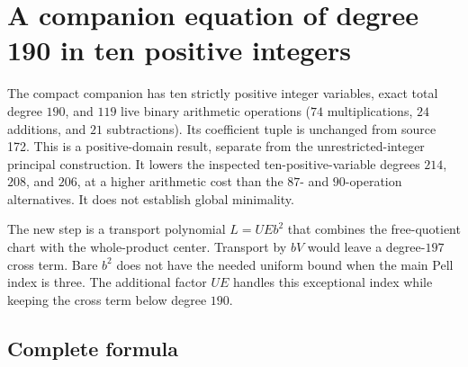 \section{A companion equation of degree 190 in ten positive integers}
\label{sec:positive190}

The compact companion has ten strictly positive integer variables, exact
total degree $190$, and $119$ live binary arithmetic operations
($74$ multiplications, $24$ additions, and $21$ subtractions).
Its coefficient tuple is unchanged from source 172.  This is a
positive-domain result, separate from the unrestricted-integer principal
construction.  It lowers the inspected ten-positive-variable degrees
$214$, $208$, and $206$, at a higher arithmetic cost than the $87$- and
$90$-operation alternatives.  It does not establish global minimality.

The new step is a transport polynomial $L=UEb^2$ that combines the
free-quotient chart with the whole-product center.  Transport by $bV$
would leave a degree-$197$ cross term.  Bare $b^2$ does not have the needed
uniform bound when the main Pell index is three.  The additional factor
$UE$ handles this exceptional index while keeping the cross term below
degree $190$.

\subsection{Complete formula}

